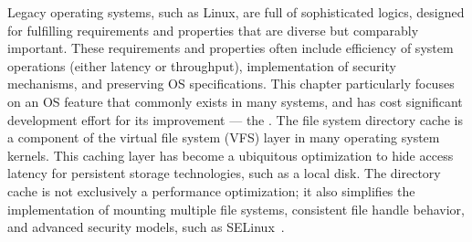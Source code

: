 
Legacy operating systems, such as Linux, are full of sophisticated logics,
designed for fulfilling
requirements and properties that are
diverse but comparably important.
These requirements and properties often include
efficiency of system operations (either latency or throughput),
implementation of security mechanisms,
and preserving OS specifications.
This chapter particularly focuses on
an OS feature that commonly exists in many systems, and has cost significant development effort for its improvement
--- the .
The file system directory cache is a component of the virtual file system (VFS) layer in many operating system kernels.
This caching layer has become a ubiquitous optimization
to hide access latency for 
persistent storage technologies, such as a local disk.
The directory cache is not exclusively a performance optimization; it also simplifies 
the implementation of mounting multiple file systems, 
consistent file handle behavior,
and advanced security 
models, such as SELinux~\citep{selinux}.






